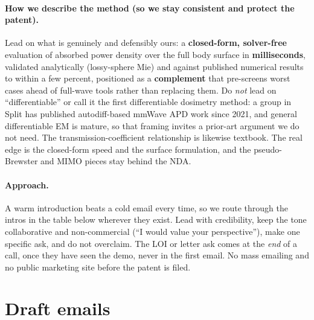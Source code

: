 \documentclass[11pt,a4paper]{article}
\begin{document}
\paragraph{How we describe the method (so we stay consistent and protect the patent).}
Lead on what is genuinely and defensibly ours: a \textbf{closed-form, solver-free} evaluation of absorbed
power density over the full body surface in \textbf{milliseconds}, validated analytically (lossy-sphere Mie)
and against published numerical results to within a few percent, positioned as a \textbf{complement} that
pre-screens worst cases ahead of full-wave tools rather than replacing them. Do \emph{not} lead on
``differentiable'' or call it the first differentiable dosimetry method: a group in Split has published
autodiff-based mmWave APD work since 2021, and general differentiable EM is mature, so that framing invites a
prior-art argument we do not need. The transmission-coefficient relationship is likewise textbook. The real
edge is the closed-form speed and the surface formulation, and the pseudo-Brewster and MIMO pieces stay behind
the NDA.

\paragraph{Approach.} A warm introduction beats a cold email every time, so we route through the intros in the
table below wherever they exist. Lead with credibility, keep the tone collaborative and non-commercial (``I
would value your perspective''), make one specific ask, and do not overclaim. The LOI or letter ask comes at
the \emph{end} of a call, once they have seen the demo, never in the first email. No mass emailing and no
public marketing site before the patent is filed.

\section{Draft emails}
\end{document}
